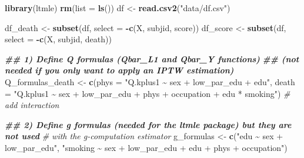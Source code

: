 \documentclass[
]{book}
\newenvironment{Shaded}{\begin{snugshade}}{\end{snugshade}}
\newcommand{\AttributeTok}[1]{\textcolor[rgb]{0.13,0.29,0.53}{#1}}
\newcommand{\CommentTok}[1]{\textcolor[rgb]{0.56,0.35,0.01}{\textit{#1}}}
\newcommand{\DocumentationTok}[1]{\textcolor[rgb]{0.56,0.35,0.01}{\textbf{\textit{#1}}}}
\newcommand{\FunctionTok}[1]{\textcolor[rgb]{0.13,0.29,0.53}{\textbf{#1}}}
\newcommand{\NormalTok}[1]{#1}
\newcommand{\OtherTok}[1]{\textcolor[rgb]{0.56,0.35,0.01}{#1}}
\newcommand{\SpecialCharTok}[1]{\textcolor[rgb]{0.81,0.36,0.00}{\textbf{#1}}}
\newcommand{\StringTok}[1]{\textcolor[rgb]{0.31,0.60,0.02}{#1}}
\begin{document}
\begin{Shaded}
\begin{Highlighting}[]
\FunctionTok{library}\NormalTok{(ltmle)}
\FunctionTok{rm}\NormalTok{(}\AttributeTok{list =} \FunctionTok{ls}\NormalTok{())}
\NormalTok{df }\OtherTok{\textless{}{-}} \FunctionTok{read.csv2}\NormalTok{(}\StringTok{"data/df.csv"}\NormalTok{)}

\NormalTok{df\_death }\OtherTok{\textless{}{-}} \FunctionTok{subset}\NormalTok{(df, }\AttributeTok{select =} \SpecialCharTok{{-}}\FunctionTok{c}\NormalTok{(X, subjid, score))}
\NormalTok{df\_score }\OtherTok{\textless{}{-}} \FunctionTok{subset}\NormalTok{(df, }\AttributeTok{select =} \SpecialCharTok{{-}}\FunctionTok{c}\NormalTok{(X, subjid, death))}

\DocumentationTok{\#\# 1) Define Q formulas (Qbar\_L1 and Qbar\_Y functions)}
\DocumentationTok{\#\# (not needed if you only want to apply an IPTW estimation)}
\NormalTok{Q\_formulas\_death }\OtherTok{\textless{}{-}} \FunctionTok{c}\NormalTok{(}\AttributeTok{phys =} \StringTok{"Q.kplus1 \textasciitilde{} sex + low\_par\_edu + edu"}\NormalTok{,}
                      \AttributeTok{death =} \StringTok{"Q.kplus1 \textasciitilde{} sex + low\_par\_edu + phys + occupation +}
\StringTok{                               edu * smoking"}\NormalTok{) }\CommentTok{\# add interaction}

\DocumentationTok{\#\# 2) Define g formulas (needed for the ltmle package) but they are not used}
\CommentTok{\#    with the g{-}computation estimator}
\NormalTok{g\_formulas }\OtherTok{\textless{}{-}} \FunctionTok{c}\NormalTok{(}\StringTok{"edu \textasciitilde{} sex + low\_par\_edu"}\NormalTok{, }
                \StringTok{"smoking \textasciitilde{} sex + low\_par\_edu + edu + phys + occupation"}\NormalTok{)}


\end{Highlighting}
\end{Shaded}
\end{document}
